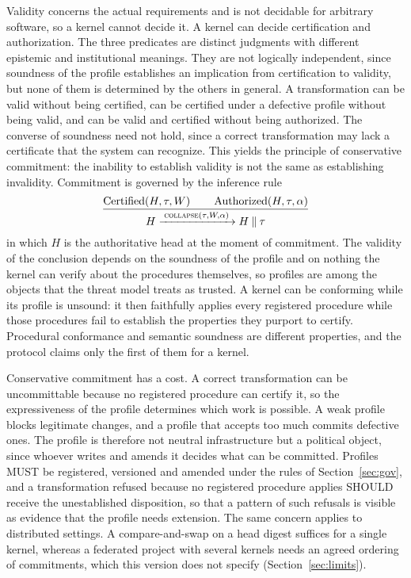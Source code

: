 \documentclass[11pt]{article}
\theoremstyle{remark}
\newcommand{\Admcert}{\operatorname{Certified}}
\newcommand{\Auth}{\operatorname{Authorized}}
\newcommand{\concat}{\mathbin{\|}}
\newcommand{\COLLAPSE}{\textsc{collapse}}
\begin{document}
Validity concerns the actual requirements and is not decidable for arbitrary software, so a kernel cannot decide it. A kernel can decide certification and authorization. The three predicates are distinct judgments with different epistemic and institutional meanings. They are not logically independent, since soundness of the profile establishes an implication from certification to validity, but none of them is determined by the others in general. A transformation can be valid without being certified, can be certified under a defective profile without being valid, and can be valid and certified without being authorized. The converse of soundness need not hold, since a correct transformation may lack a certificate that the system can recognize. This yields the principle of conservative commitment: the inability to establish validity is not the same as establishing invalidity. Commitment is governed by the inference rule
\[
\frac{\Admcert(H,\tau,W)\qquad\Auth(H,\tau,\alpha)}
{H\xrightarrow{\;\COLLAPSE(\tau,W,\alpha)\;}H\concat\tau}
\]
in which $H$ is the authoritative head at the moment of commitment. The validity of the conclusion depends on the soundness of the profile and on nothing the kernel can verify about the procedures themselves, so profiles are among the objects that the threat model treats as trusted. A kernel can be conforming while its profile is unsound: it then faithfully applies every registered procedure while those procedures fail to establish the properties they purport to certify. Procedural conformance and semantic soundness are different properties, and the protocol claims only the first of them for a kernel.

Conservative commitment has a cost. A correct transformation can be uncommittable because no registered procedure can certify it, so the expressiveness of the profile determines which work is possible. A weak profile blocks legitimate changes, and a profile that accepts too much commits defective ones. The profile is therefore not neutral infrastructure but a political object, since whoever writes and amends it decides what can be committed. Profiles MUST be registered, versioned and amended under the rules of Section~\ref{sec:gov}, and a transformation refused because no registered procedure applies SHOULD receive the unestablished disposition, so that a pattern of such refusals is visible as evidence that the profile needs extension. The same concern applies to distributed settings. A compare-and-swap on a head digest suffices for a single kernel, whereas a federated project with several kernels needs an agreed ordering of commitments, which this version does not specify (Section~\ref{sec:limits}).
\end{document}
